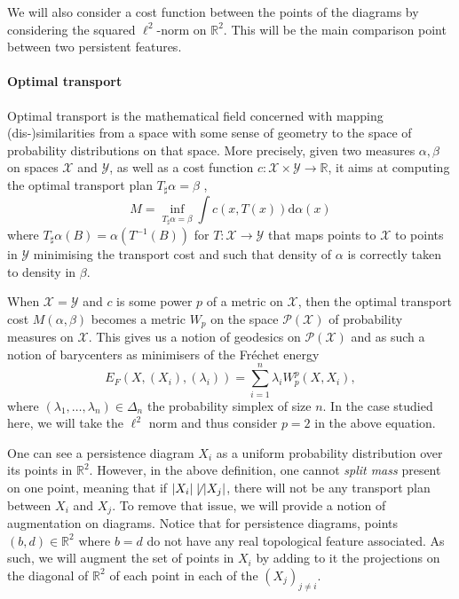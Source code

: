 \documentclass[sigconf,nonacm]{acmart}
\def\abs#1{\left|#1\right|}
\def\X{\mathcal{X}}
\def\Y{\mathcal{Y}}
\def\R{\mathbb{R}}
\begin{document}
We will also consider a cost function between the points of the diagrams by
considering the squared $\ell^{2}$-norm on $\mathbb{R}^{2}$.
This will be the main comparison point between two persistent features.

\paragraph{Optimal transport}
Optimal transport is the mathematical field concerned with mapping
(dis-)similarities from a space with some sense of geometry to the space of
probability distributions on that space.
More precisely, given two measures $\alpha, \beta$ on spaces $\mathcal{X}$ and
$\mathcal{Y}$, as well as a cost function $c: \X \times \Y \to \R$, it aims at
computing the optimal transport plan $T_{\sharp}\alpha = \beta$ ,
\begin{equation*}
	M = \inf_{T_{\sharp}\alpha = \beta} \int c(x, T(x))\mathrm{d}\alpha(x)
\end{equation*}
where $T_{\sharp}\alpha (B) = \alpha\left(T^{-1}\left(B\right)\right)$ for
$T: \X \to \Y$ that maps points to $\X$ to points in $\Y$ minimising the transport
cost and such that density of $\alpha$ is correctly taken to density in $\beta$.

\smallskip

When $\X = \Y$ and $c$ is some power $p$ of a metric on $\X$, then the optimal transport
cost $M(\alpha, \beta)$ becomes a metric $W_{p}$ on the space $\mathcal{P}(\X)$ of
probability measures on $\X$.
This gives us a notion of geodesics on $\mathcal{P}(\X)$ and as such a notion
of barycenters as minimisers of the Fréchet energy
\begin{equation*}
	E_{F}\left(X, \left(X_{i}\right), \left(\lambda_{i}\right)\right) =
	\sum_{i = 1}^{n}\lambda_{i}W_{p}^{p}(X, X_{i}),
\end{equation*}
where $\left(\lambda_{1}, \ldots, \lambda_{n}\right) \in \Delta_{n}$ the probability simplex
of size $n$.
In the case studied here, we will take the $\ell^{2}$ norm and thus consider $p= 2$
in the above equation.

\smallskip

One can see a persistence diagram $X_{i}$ as a uniform probability distribution over
its points in $\R^{2}$.
However, in the above definition, one cannot \emph{split mass} present on one point,
meaning that if $\abs{X_{i}} \not\mid \abs{X_{j}}$, there will not be any transport
plan between $X_{i}$ and $X_{j}$.
To remove that issue, we will provide a notion of augmentation on diagrams.
Notice that for persistence diagrams, points $(b, d) \in \R^{2}$ where $b = d$ do
not have any real topological feature associated.
As such, we will augment the set of points in $X_{i}$ by adding to it the projections
on the diagonal of $\R^{2}$ of each point in each of the $(X_{j})_{j \neq i}$.
\end{document}
